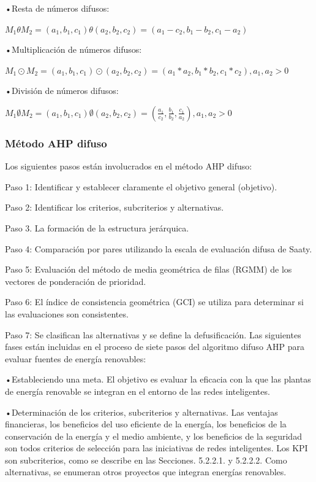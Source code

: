 \documentclass[
]{article}
\begin{document}
•Resta de números difusos:

\(M_1θM_2=(a_1, b_1, c_1)θ(a_2, b_2, c_2)=(a_1-c_2,b_1-b_2,c_1-a_2)\)

•Multiplicación de números difusos:

\(M_1⊙M_2=(a_1, b_1, c_1)⊙(a_2, b_2, c_2)=(a_1 *a_2, b_1 * b_2, c_1 * c_2),a_1,a_2>0\)

•División de números difusos:

\(M_1∅M_2=(a_1, b_1, c_1)∅(a_2, b_2, c_2)=(\frac{a_1}{c_2},\frac{b_1}{b_2},\frac{c_1}{a_2}),a_1,a_2>0\)

\hypertarget{muxe9todo-ahp-difuso}{%
\subsubsection{Método AHP difuso}\label{muxe9todo-ahp-difuso}}

Los siguientes pasos están involucrados en el método AHP difuso:

Paso 1: Identificar y establecer claramente el objetivo general
(objetivo).

Paso 2: Identificar los criterios, subcriterios y alternativas.

Paso 3. La formación de la estructura jerárquica.

Paso 4: Comparación por pares utilizando la escala de evaluación difusa
de Saaty.

Paso 5: Evaluación del método de media geométrica de filas (RGMM) de los
vectores de ponderación de prioridad.

Paso 6: El índice de consistencia geométrica (GCI) se utiliza para
determinar si las evaluaciones son consistentes.

Paso 7: Se clasifican las alternativas y se define la defusificación.
Las siguientes fases están incluidas en el proceso de siete pasos del
algoritmo difuso AHP para evaluar fuentes de energía renovables:

•Estableciendo una meta. El objetivo es evaluar la eficacia con la que
las plantas de energía renovable se integran en el entorno de las redes
inteligentes.

•Determinación de los criterios, subcriterios y alternativas. Las
ventajas financieras, los beneficios del uso eficiente de la energía,
los beneficios de la conservación de la energía y el medio ambiente, y
los beneficios de la seguridad son todos criterios de selección para las
iniciativas de redes inteligentes. Los KPI son subcriterios, como se
describe en las Secciones. 5.2.2.1. y 5.2.2.2. Como alternativas, se
enumeran otros proyectos que integran energías renovables.
\end{document}

